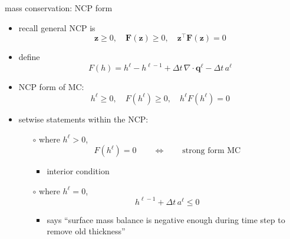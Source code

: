 \documentclass[xcolor={dvipsnames}]{beamer}
\newcommand\bq{\mathbf{q}}
\newcommand\bz{\mathbf{z}}
\newcommand\bF{\mathbf{F}}
\newcommand\Div{\nabla\cdot}
\begin{document}
\begin{frame}{mass conservation: NCP form}

\begin{itemize}
\item recall general NCP is
  $$\bz \ge 0, \quad \bF(\bz) \ge 0, \quad \bz^\top \bF(\bz) = 0$$
\item define
    $$F(h) = h^\ell - h^{\ell-1} + \Delta t\, \Div \bq^\ell - \Delta t\, a^\ell$$
\item NCP form of MC:
   $$h^\ell \ge 0, \quad F(h^\ell) \ge 0, \quad h^\ell F(h^\ell) = 0$$
\item setwise statements within the NCP:
    \begin{itemize}
    \item[$\circ$] where $h^\ell > 0$,
        $$F(h^\ell) = 0 \qquad \iff \qquad \text{strong form MC}$$
        \vspace{-4mm}
        \begin{itemize}
        \item interior condition
        \end{itemize}
    \item[$\circ$] where $h^\ell = 0$,
        $$h^{\ell-1} + \Delta t\, a^\ell \le 0$$
        \vspace{-4mm}
        \begin{itemize}
        \item says ``surface mass balance is negative enough during time step to remove old thickness''
        \end{itemize}
    \end{itemize}
\end{itemize}
\end{frame}
\end{document}
